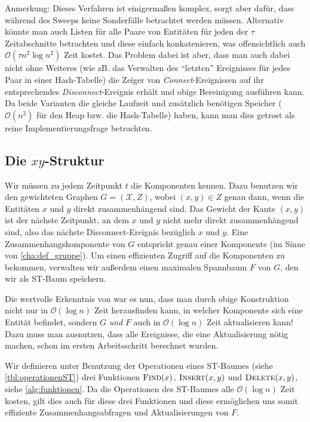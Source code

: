 Anmerkung: Dieses Verfahren ist einigermaßen komplex, sorgt aber dafür, dass während des Sweeps keine Sonderfälle betrachtet werden müssen.
Alternativ könnte man auch Listen für alle Paare von Entitäten für jeden der $\tau$ Zeitabschnitte betrachten und diese einfach konkatenieren, was offensichtlich auch $\mathcal{O}(\tau n^2 \log n^2)$ Zeit kostet.
Das Problem dabei ist aber, dass man auch dabei nicht ohne Weiteres (wie zB. das Verwalten des \enquote{letzten} Ereignisses für jedes Paar in einer Hash-Tabelle) die Zeiger von \emph{Connect}-Ereignissen auf ihr entsprechendes \emph{Disconnect}-Ereignis erhält und obige Bereinigung ausführen kann.
Da beide Varianten die gleiche Laufzeit und zusätzlich benötigen Speicher ($\mathcal{O}(n^2)$ für den Heap bzw. die Hash-Tabelle) haben, kann man dies getrost als reine Implementierungsfrage betrachten.

\subsection{Die $xy$-Struktur} %
\label{sub:xy_struktur}
Wir müssen zu jedem Zeitpunkt $t$ die Komponenten kennen.
Dazu benutzen wir den gewichteten Graphen $G=(\mathcal{X},Z)$, wobei $(x,y) \in Z$ genau dann, wenn die Entitäten $x$ und $y$ direkt zusammenhängend sind.
Das Gewicht der Kante $(x,y)$ ist der nächste Zeitpunkt, an dem $x$ und $y$ nicht mehr direkt zusammenhängend sind, also das nächste Disconnect-Ereignis bezüglich $x$ und $y$.
Eine Zusammenhangskomponente von $G$ entspricht genau einer Komponente (im Sinne von \cref{cha:def_gruppe}).
Um einen effizienten Zugriff auf die Komponenten zu bekommen, verwalten wir außerdem einen maximalen Spannbaum $F$ von $G$, den wir als ST-Baum speichern.

Die wertvolle Erkenntnis von \textcite{parsaReeb} war es nun, dass man durch obige Konstruktion nicht nur in $\mathcal{O}(\log n)$ Zeit herausfinden kann, in welcher Komponente sich eine Entität befindet, sondern $G$ \emph{und} $F$ auch in $\mathcal{O}(\log n)$ Zeit aktualisieren kann!
Dazu muss man ausnutzen, dass alle Ereignisse, die eine Aktualisierung nötig machen, schon im ersten Arbeitsschritt berechnet wurden.

Wir definieren unter Benutzung der Operationen eines ST-Baumes (siehe \cref{tbl:operationenST}) drei Funktionen $\textsc{Find}(x)$, $\textsc{Insert}(x,y)$ und $\textsc{Delete}(x,y)$, siehe \cref{alg:funktionen}.
Da die Operationen des ST-Baumes alle $\mathcal{O}(\log n)$ Zeit kosten, gilt dies auch für diese drei Funktionen und diese ermöglichen uns somit effiziente Zusammenhangsabfragen und Aktualisierungen von $F$.

